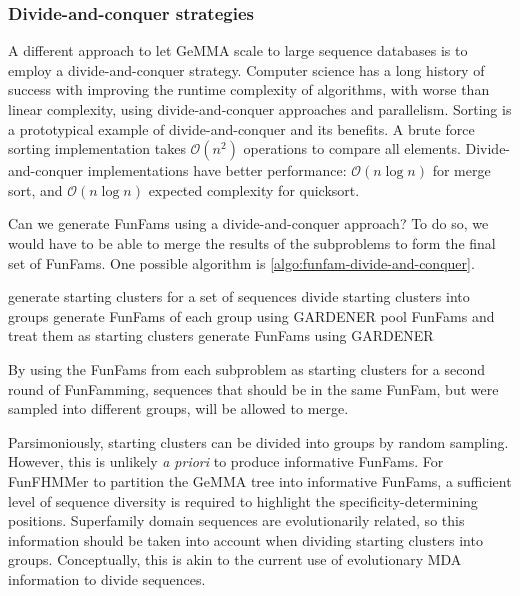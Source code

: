 \subsubsection{Divide-and-conquer strategies}

A different approach to let GeMMA scale to large sequence databases is to employ a divide-and-conquer strategy. Computer science has a long history of success with improving the runtime complexity of algorithms, with worse than linear complexity, using divide-and-conquer approaches and parallelism. Sorting is a prototypical example of divide-and-conquer and its benefits. A brute force sorting implementation takes $\mathcal{O}(n^2)$ operations to compare all elements. Divide-and-conquer implementations have better performance: $\mathcal{O}(n \log n)$ for merge sort, and $\mathcal{O}(n \log n)$ expected complexity for quicksort.

Can we generate FunFams using a divide-and-conquer approach? To do so, we would have to be able to merge the results of the subproblems to form the final set of FunFams. One possible algorithm is \ref{algo:funfam-divide-and-conquer}.

\begin{algorithm}[hbt!]
    \caption{%
        Divide-and-conquer algorithm to generate FunFams.
    }
    \label{algo:funfam-divide-and-conquer}
    \begin{algorithmic}[1]
        \Procedure{}{}
        \State generate starting clusters for a set of sequences
        \State divide starting clusters into groups
            \State generate FunFams of each group using GARDENER
        \EndFor
        \State pool FunFams and treat them as starting clusters
        \State generate FunFams using GARDENER
        \EndProcedure
    \end{algorithmic}
\end{algorithm}

By using the FunFams from each subproblem as starting clusters for a second round of FunFamming, sequences that should be in the same FunFam, but were sampled into different groups, will be allowed to merge.

Parsimoniously, starting clusters can be divided into groups by random sampling. However, this is unlikely \emph{a priori} to produce informative FunFams. For FunFHMMer to partition the GeMMA tree into informative FunFams, a sufficient level of sequence diversity is required to highlight the specificity-determining positions. Superfamily domain sequences are evolutionarily related, so this information should be taken into account when dividing starting clusters into groups. Conceptually, this is akin to the current use of evolutionary MDA information to divide sequences.

